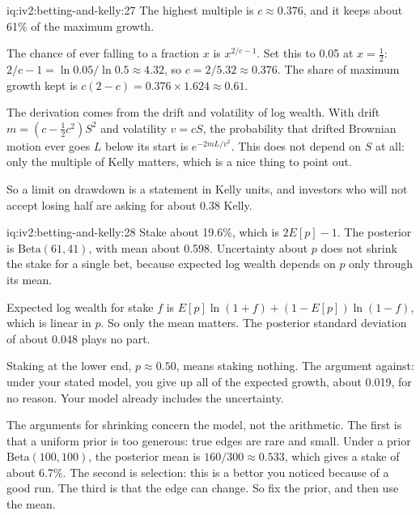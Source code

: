 \begin{solution}{iq:iv2:betting-and-kelly:27}
The highest multiple is $c \approx 0.376$, and it keeps about 61\% of the maximum growth.

The chance of ever falling to a fraction $x$ is $x^{2/c - 1}$. Set this to 0.05 at $x = \tfrac12$: $2/c - 1 = \ln 0.05/\ln 0.5 \approx 4.32$, so $c = 2/5.32 \approx 0.376$. The share of maximum growth kept is $c(2 - c) = 0.376 \times 1.624 \approx 0.61$.

The derivation comes from the drift and volatility of log wealth. With drift $m = (c - \tfrac12 c^2)S^2$ and volatility $v = cS$, the probability that drifted Brownian motion ever goes $L$ below its start is $e^{-2mL/v^2}$. This does not depend on $S$ at all: only the multiple of Kelly matters, which is a nice thing to point out.

So a limit on drawdown is a statement in Kelly units, and investors who will not accept losing half are asking for about 0.38 Kelly.

\end{solution}

\begin{solution}{iq:iv2:betting-and-kelly:28}
Stake about 19.6\%, which is $2E[p] - 1$. The posterior is $\mathrm{Beta}(61, 41)$, with mean about 0.598. Uncertainty about $p$ does not shrink the stake for a single bet, because expected log wealth depends on $p$ only through its mean.

Expected log wealth for stake $f$ is $E[p]\ln(1 + f) + (1 - E[p])\ln(1 - f)$, which is linear in $p$. So only the mean matters. The posterior standard deviation of about 0.048 plays no part.

Staking at the lower end, $p \approx 0.50$, means staking nothing. The argument against: under your stated model, you give up all of the expected growth, about 0.019, for no reason. Your model already includes the uncertainty.

The arguments for shrinking concern the model, not the arithmetic. The first is that a uniform prior is too generous: true edges are rare and small. Under a prior $\mathrm{Beta}(100, 100)$, the posterior mean is $160/300 \approx 0.533$, which gives a stake of about 6.7\%. The second is selection: this is a bettor you noticed because of a good run. The third is that the edge can change. So fix the prior, and then use the mean.

\end{solution}

